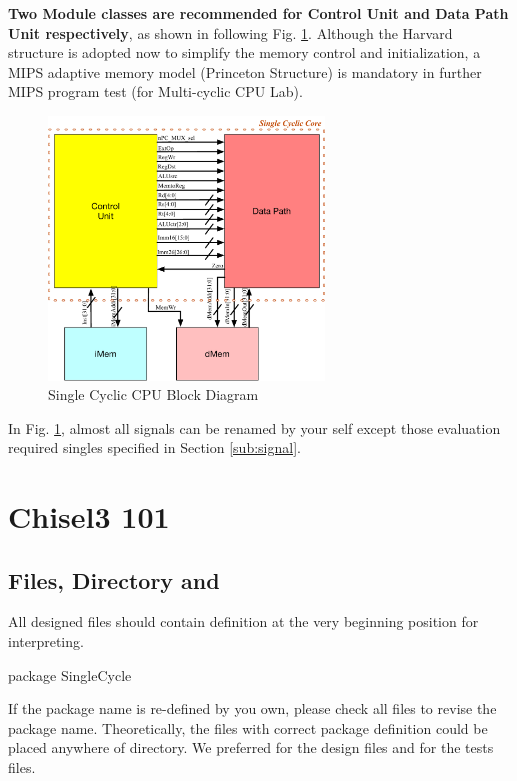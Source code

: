 \documentclass[a4paper]{article}
\begin{document}
\textbf{Two Module classes are recommended for Control Unit and Data Path Unit respectively}, as shown in following Fig. \ref{fig:modules}. Although the Harvard structure is adopted now to simplify the memory control and initialization, a MIPS adaptive memory model (Princeton Structure) is mandatory in further MIPS program test (for Multi-cyclic CPU Lab).  
\begin{figure}[ht]
 \centering
 \includegraphics[height=7cm]{images/l1modules.pdf}
 \caption{Single Cyclic CPU Block Diagram}
 \label{fig:modules}
\end{figure}
In Fig. \ref{fig:modules}, almost all signals can be renamed by your self except those evaluation required singles specified in Section \ref{sub:signal}.

\newpage
\section{Chisel3 101} \label{Datatypes}%
\subsection{Files, Directory and }\label{sub:package}
All designed files should contain  definition at the very beginning position for  interpreting.
\begin{scala} 
package SingleCycle
\end{scala} 
If the package name is re-defined by you own, please check all files to revise the package name.
Theoretically,  the files with correct package definition could be placed anywhere of  directory. We preferred  for the design files and  for the tests files.
\end{document}
